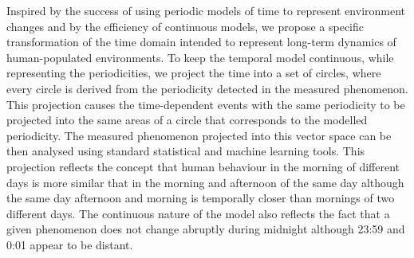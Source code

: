 Inspired by the success of using periodic models of time to represent environment changes and by the efficiency of continuous models, we propose a specific transformation of the time domain intended to represent long-term dynamics of human-populated environments. 
To keep the temporal model continuous, while representing the periodicities, we project the time into a set of circles, where every circle is derived from the periodicity detected in the measured phenomenon.
This projection causes the time-dependent events with the same periodicity to be projected into the same areas of a circle that corresponds to the modelled periodicity.
The measured phenomenon projected into this vector space can be then analysed using standard statistical and machine learning tools.
This projection reflects the concept that human behaviour in the morning of different days is more similar that in the morning and afternoon of the same day although the same day afternoon and morning is temporally closer than mornings of two different days. 
The continuous nature of the model also reflects the fact that a given phenomenon does not change abruptly during midnight although 23:59 and 0:01 appear to be distant. 
